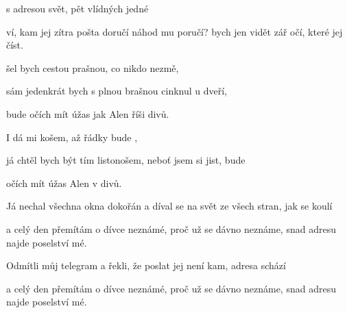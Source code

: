 
  \zs

 s adresou svět,  pět vlídných 
 jedné  

 ví, kam jej zítra pošta doručí  náhod mu poručí?  
 bych jen vidět zář očí, které  jej číst. 

\ks
\zr

 šel bych cestou prašnou, co nikdo nezmě,

sám jedenkrát bych s plnou brašnou cinknul u dveří,

bude  očích mít úžas jak Alen  říši divů.

I  dá mi košem, až řádky bude ,

já chtěl bych být tím listonošem, neboť jsem si jist, bude

 očích mít úžas  Alen v  divů. 

\kr
\zs

Já nechal všechna okna dokořán a díval se na svět ze všech stran, jak se koulí

a celý den přemítám o dívce neznámé, proč už se dávno neznáme, snad adresu 
najde poselství mé. 

\ks
\zr  \kr
\zs

Odmítli můj telegram a řekli, že poslat jej není kam, adresa schází

a celý den přemítám o dívce neznámé, proč už se dávno neznáme, snad adresu 
najde poselství mé.

\ks

\zr  \kr

\kp

